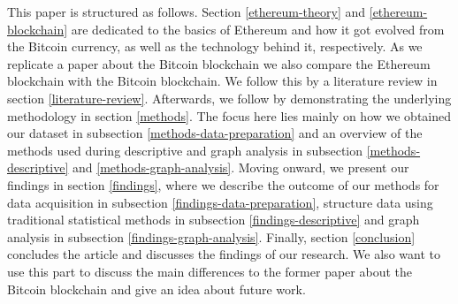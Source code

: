 This paper is structured as follows. 
Section \ref{ethereum-theory} and \ref{ethereum-blockchain} are dedicated to the basics of Ethereum and how it got evolved from the Bitcoin currency, as well as the technology behind it, respectively. 
As we replicate a paper about the Bitcoin blockchain \cite{lischke2016analyzing} we also compare the Ethereum blockchain with the Bitcoin blockchain. We follow this by a literature review in section \ref{literature-review}.
Afterwards, we follow by demonstrating the underlying methodology in section \ref{methods}. 
The focus here lies mainly on how we obtained our dataset in subsection \ref{methods-data-preparation} and an overview of the methods used during descriptive and graph analysis in subsection \ref{methods-descriptive} and \ref{methods-graph-analysis}. 
Moving onward, we present our findings in section \ref{findings}, where we describe the outcome of our methods for data acquisition in subsection \ref{findings-data-preparation}, structure data using traditional statistical methods in subsection \ref{findings-descriptive} and graph analysis in subsection \ref{findings-graph-analysis}.
Finally, section \ref{conclusion} concludes the article and discusses the findings of our research. 
We also want to use this part to discuss the main differences to the former paper about the Bitcoin blockchain and give an idea about future work.

